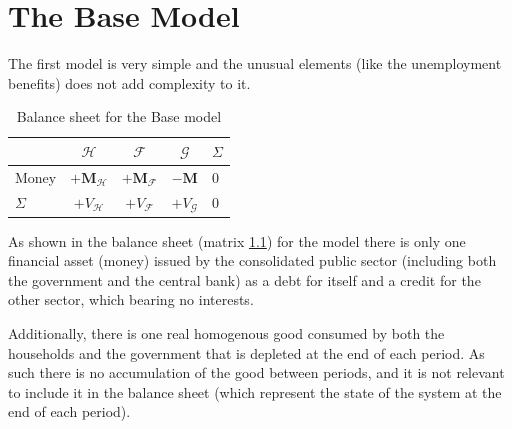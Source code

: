 \chapter{The Base Model}
\label{ch:m0}
The first model is very simple and the unusual elements (like the unemployment benefits) does not add complexity to it.

\begin{table}
    \centering
    \begin{tabular}{l|ccc|l}
                 & $\mathcal{H}$             & $\mathcal{F}$               & $\mathcal{G}$    & $\Sigma$ \\
        \midrule
        Money    & $+\mathbf{M}_\mathcal{H}$ & $+\mathbf{M}_{\mathcal{F}}$ & $-\mathbf{M}$    & 0        \\
        \midrule
        $\Sigma$ & $+V_\mathcal{H}$          & $+V_{\mathcal{F}}$          & $+V_\mathcal{G}$ & 0        \\
    \end{tabular}
    \caption{Balance sheet for the Base model}
    \label{tab:bs}
\end{table}

As shown in the balance sheet (matrix \ref{tab:bs}) for the model there is only one financial asset (money) issued by the consolidated public sector (including both the government and the central bank) as a debt for itself and a credit for the other sector, which bearing no interests.

Additionally, there is one real homogenous good consumed by both the households and the government that is depleted at the end of each period.
As such there is no accumulation of the good between periods, and it is not relevant to include it in the balance sheet (which represent the state of the system at the end of each period).

